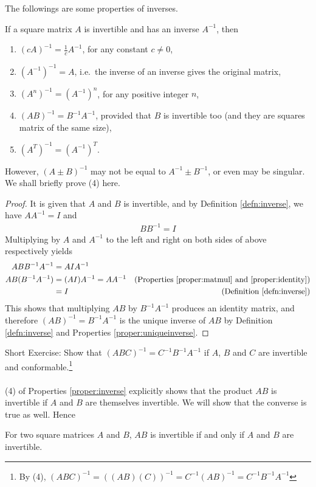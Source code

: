 The followings are some properties of inverses.
\begin{proper}
\label{proper:inverse}
If a square matrix $A$ is invertible and has an inverse $A^{-1}$, then
\begin{enumerate}
\item $(cA)^{-1} = \frac{1}{c}A^{-1}$, for any constant $c \neq 0$,
\item $(A^{-1})^{-1} = A$, i.e.\ the inverse of an inverse gives the original matrix,
\item $(A^n)^{-1} = (A^{-1})^n$, for any positive integer $n$,
\item $(AB)^{-1} = B^{-1}A^{-1}$, provided that $B$ is invertible too (and they are squares matrix of the same size),
\item $(A^T)^{-1} = (A^{-1})^T$.
\end{enumerate}
\end{proper}
However, $(A\pm B)^{-1}$ may not be equal to $A^{-1} \pm B^{-1}$, or even may be singular. We shall briefly prove (4) here.
\begin{proof}
It is given that $A$ and $B$ is invertible, and by Definition \ref{defn:inverse}, we have $AA^{-1} = I$ and 
\begin{align*}
BB^{-1} = I    
\end{align*}
Multiplying by $A$ and $A^{-1}$ to the left and right on both sides of above respectively yields
\begin{align*}
ABB^{-1}A^{-1} &= AIA^{-1} \\
AB(B^{-1}A^{-1}) &= (AI)A^{-1} = AA^{-1} & \text{(Properties \ref{proper:matmul} and \ref{proper:identity})} \\
&= I & \text{(Definition \ref{defn:inverse})}
\end{align*}
This shows that multiplying $AB$ by $B^{-1}A^{-1}$ produces an identity matrix, and therefore $(AB)^{-1} = B^{-1}A^{-1}$ is the unique inverse of $AB$ by Definition \ref{defn:inverse} and Properties \ref{proper:uniqueinverse}.
\end{proof}
Short Exercise: Show that $(ABC)^{-1} = C^{-1}B^{-1}A^{-1}$ if $A$, $B$ and $C$ are invertible and conformable.\footnote{By (4), $(ABC)^{-1} = ((AB)(C))^{-1} = C^{-1}(AB)^{-1} = C^{-1}B^{-1}A^{-1}$}\\
\\
(4) of Properties \ref{proper:inverse} explicitly shows that the product $AB$ is invertible if $A$ and $B$ are themselves invertible. We will show that the converse is true as well. Hence
\begin{proper}
\label{proper:ABinv}
For two square matrices $A$ and $B$, $AB$ is invertible if and only if $A$ and $B$ are invertible.
\end{proper}
